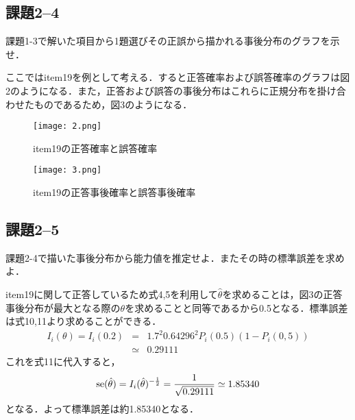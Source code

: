 \documentclass[12pt]{jarticle}
\begin{document}
\subsection{課題2–4}
\begin{shadebox}
    \quad 課題1-3で解いた項目から1題選びその正誤から描かれる事後分布のグラフを示せ．
\end{shadebox}
\vspace{\baselineskip}
ここではitem19を例として考える．すると正答確率および誤答確率のグラフは図2のようになる．また，正答および誤答の事後分布はこれらに正規分布を掛け合わせたものであるため，図3のようになる．
\clearpage
\begin{figure}[h]
    \begin{center}
        \texttt{[image: 2.png]}
    \end{center}
    \caption{item19の正答確率と誤答確率}
    \label{fig2}
\end{figure}
\begin{figure}[h]
    \begin{center}
        \texttt{[image: 3.png]}
    \end{center}
    \caption{item19の正答事後確率と誤答事後確率}
    \label{fig3}
\end{figure}
\subsection{課題2–5}
\begin{shadebox}
    \quad 課題2-4で描いた事後分布から能力値を推定せよ．またその時の標準誤差を求めよ．
\end{shadebox}
\vspace{\baselineskip}
item19に関して正答しているため式4,5を利用して$\hat{\theta}$を求めることは，図3の正答事後分布が最大となる際の$\theta$を求めることと同等であるから0.5となる．標準誤差は式10,11より求めることができる．
\begin{eqnarray*}
    I_i(\theta)=I_i(0.2)
    &=&1.7^2 0.64296^2P_i(0.5)(1-P_i(0,5))\\
    &\simeq&0.29111
\end{eqnarray*}
これを式11に代入すると，
\begin{eqnarray*}
    {\rm se}(\hat{\theta})=I_i(\hat{\theta})^{-\frac{1}{2}}=\frac{1}{\sqrt{0.29111}}\simeq1.85340
\end{eqnarray*}
となる．よって標準誤差は約1.85340となる．
\end{document}
